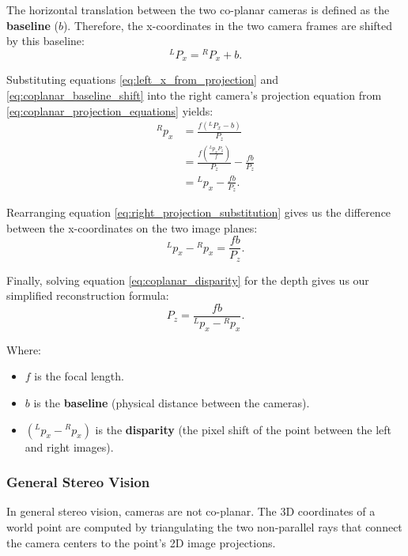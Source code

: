 The horizontal translation between the two co-planar cameras is defined as the \textbf{baseline} ($b$). 
Therefore, the x-coordinates in the two camera frames are shifted by this baseline:
\begin{equation}
    {}^{L}P_x = {}^{R}P_x + b.
    \label{eq:coplanar_baseline_shift}
\end{equation}

Substituting equations \ref{eq:left_x_from_projection} and \ref{eq:coplanar_baseline_shift} into the right camera's projection equation from \ref{eq:coplanar_projection_equations} yields:
\begin{equation}
    \begin{aligned}
        {}^{R}p_x
            &= \frac{f({}^{L}P_x - b)}{P_z} \\
            &= \frac{f\left(\frac{{}^{L}p_x P_z}{f}\right)}{P_z} - \frac{f b}{P_z} \\
            &= {}^{L}p_x - \frac{f b}{P_z}.
    \end{aligned}
    \label{eq:right_projection_substitution}
\end{equation}

Rearranging equation \ref{eq:right_projection_substitution} gives us the difference between the x-coordinates on the two image planes:
\begin{equation}
    {}^{L}p_x - {}^{R}p_x = \frac{f b}{P_z}.
    \label{eq:coplanar_disparity}
\end{equation}

Finally, solving equation \ref{eq:coplanar_disparity} for the depth gives us our simplified reconstruction formula:
\begin{equation}
    P_z = \frac{f b}{{}^{L}p_x - {}^{R}p_x}.
    \label{eq:coplanar_depth_from_disparity}
\end{equation}

Where:
\begin{itemize}
    \item $f$ is the focal length.
    \item $b$ is the \textbf{baseline} (physical distance between the cameras).
    \item $({}^{L}p_x - {}^{R}p_x)$ is the \textbf{disparity} (the pixel shift of the point between the left and right images).
\end{itemize}

\subsubsection{General Stereo Vision}
In general stereo vision, cameras are not co-planar. The 3D coordinates of a world point are computed by triangulating the two non-parallel rays that connect the camera centers to the point's 2D image projections.

